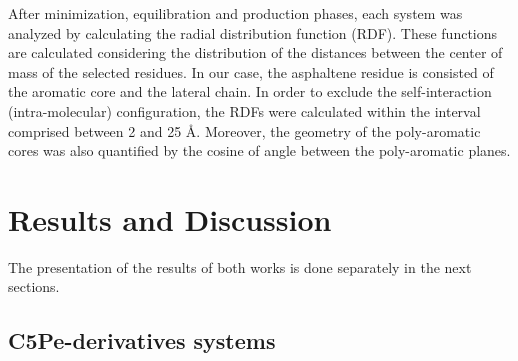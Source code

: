 After minimization, equilibration and production phases, each system was analyzed by calculating the radial distribution function (RDF). These functions are calculated considering the distribution of the distances between the center of mass of the selected residues. In our case, the asphaltene residue is consisted of the aromatic core and the lateral chain. In order to exclude the self-interaction (intra-molecular) configuration, the RDFs were calculated within the interval comprised between 2 and 25 \textup{\AA}. Moreover, the geometry of the poly-aromatic cores was also quantified by the cosine of angle between the poly-aromatic planes. 





\section{Results and Discussion}

The presentation of the results of both works is done separately in the next sections.

\subsection{C5Pe-derivatives systems}

